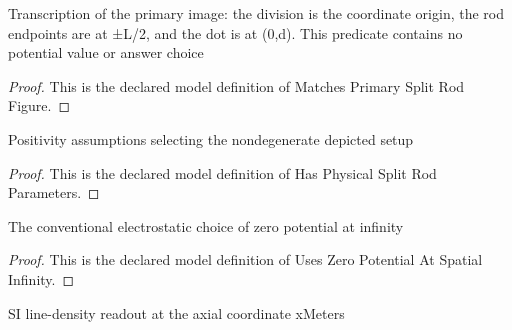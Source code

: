 \begin{definition}
  \label{def:physics:phyx-mini-0863:phyxminiproblems-problemphyxmini0863-matchesprimarysplitrodfigure}
  Transcription of the primary image: the division is the coordinate origin, the rod endpoints are at ±L/2, and the dot is at (0,d). This predicate contains no potential value or answer choice
\end{definition}
\begin{proof}
  This is the declared model definition of Matches Primary Split Rod Figure.
\end{proof}
\begin{definition}
  \label{def:physics:phyx-mini-0863:phyxminiproblems-problemphyxmini0863-hasphysicalsplitrodparameters}
  Positivity assumptions selecting the nondegenerate depicted setup
\end{definition}
\begin{proof}
  This is the declared model definition of Has Physical Split Rod Parameters.
\end{proof}
\begin{definition}
  \label{def:physics:phyx-mini-0863:phyxminiproblems-problemphyxmini0863-useszeropotentialatspatialinfinity}
  The conventional electrostatic choice of zero potential at infinity
\end{definition}
\begin{proof}
  This is the declared model definition of Uses Zero Potential At Spatial Infinity.
\end{proof}
\begin{definition}
  \label{def:physics:phyx-mini-0863:phyxminiproblems-problemphyxmini0863-rodlinechargedensityincoulombspermeter}
  SI line-density readout at the axial coordinate xMeters
\end{definition}
